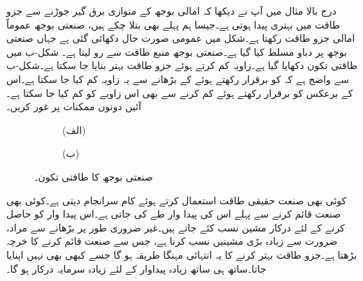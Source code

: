 درج بالا مثال میں آپ نے دیکھا کہ امالی بوجھ کے متوازی برق گیر جوڑنے سے جزو طاقت میں بہتری پیدا ہوتی ہے۔جیسا ہم پہلے بھی بتلا چکے ہیں، صنعتی بوجھ عموماً امالی جزو طاقت رکھتا ہے۔شکل  میں عمومی صورت حال دکھائی گئی ہے جہاں صنعتی بوجھ پر  دباو مسلط کیا گیا ہے۔صنعتی بوجھ منبع طاقت سے  رو لیتا ہے۔ شکل-ب میں طاقتی تکون دکھایا گیا ہے۔زاویہ  کم کرتے ہوئے جزو طاقت بہتر بنایا جا سکتا ہے۔شکل-ب سے واضح ہے کہ  کو برقرار رکھتے ہوئے  کے بڑھانے سے یہ زاویہ کم کیا جا سکتا ہے۔اس کے برعکس  کو برقرار رکھتے ہوئے  کم کرنے   سے بھی اس زاویے کو کم  کیا جا سکتا ہے۔آئیں دونوں ممکنات پر غور کریں۔
\begin{figure}
\centering
\begin{subfigure}{0.5\textwidth}
\centering
{}
\caption*{(الف)}
\end{subfigure}%
\begin{subfigure}{0.5\textwidth}
\centering
{}
\caption*{(ب)}
\end{subfigure}%
\caption{صنعتی بوجھ کا طاقتی تکون۔}
\label{شکل_طاقت_درستگی_جزو_طاقت_صنعتی}
\end{figure}

کوئی بھی صنعت حقیقی طاقت  استعمال کرتے ہوئے کام سرانجام دیتی ہے۔کوئی بھی صنعت قائم کرنے سے پہلے اس کی پیدا وار طے کی جاتی ہے۔اس پیدا وار کو حاصل کرنے کے لئے درکار مشین نسب کئے جاتے ہیں۔غیر ضروری طور پر  بڑھانے سے مراد، ضرورت سے زیادہ بڑی مشینیں نسب کرنا ہے، جس سے صنعت قائم کرنے کا خرچہ بڑھتا ہے۔جزو طاقت بہتر کرنے کا یہ انتہائی مہنگا طریقہ ہو گا جسے کبھی بھی نہیں اپنایا جاتا۔ساتھ ہی ساتھ زیادہ پیداوار کے لئے زیادہ سرمایہ درکار ہو گا۔

